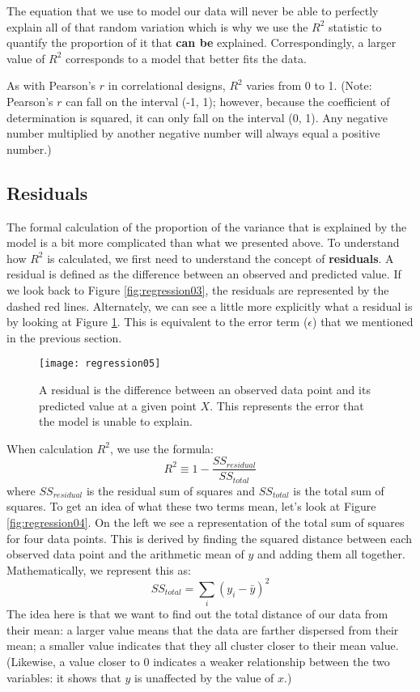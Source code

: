 The equation that we use to model our data will never be able to perfectly explain all of that random variation which is why we use the $R^2$ statistic to quantify the proportion of it that \textbf{can be} explained. Correspondingly, a larger value of $R^2$ corresponds to a model that better fits the data.

As with Pearson's $r$ in correlational designs, $R^2$ varies from 0 to 1. (Note: Pearson's $r$ can fall on the interval (-1, 1); however, because the coefficient of determination is squared, it can only fall on the interval (0, 1). Any negative number multiplied by another negative number will always equal a positive number.)

\subsection{Residuals}

The formal calculation of the proportion of the variance that is explained by the model is a bit more complicated than what we presented above. To understand how $R^2$ is calculated, we first need to understand the concept of \textbf{residuals}. A residual is defined as the difference between an observed and predicted value. If we look back to Figure \ref{fig:regression03}, the residuals are represented by the dashed red lines. Alternately, we can see a little more explicitly what a residual is by looking at Figure \ref{fig:regression05}. This is equivalent to the error term ($\epsilon$) that we mentioned in the previous section.

\begin{figure}[h]
\texttt{[image: regression05]}
\label{fig:regression05}
\caption{A residual is the difference between an observed data point and its predicted value at a given point $X$. This represents the error that the model is unable to explain.}
\end{figure}

When calculation $R^2$, we use the formula:
\begin{equation}
R^2 \equiv 1-\frac{SS_{residual}}{SS_{total}}
\end{equation}
where $SS_{residual}$ is the residual sum of squares and $SS_{total}$ is the total sum of squares. To get an idea of what these two terms mean, let's look at Figure \ref{fig:regression04}. On the left we see a representation of the total sum of squares for four data points. This is derived by finding the squared distance between each observed data point and the arithmetic mean of $y$ and adding them all together. Mathematically, we represent this as:
\begin{equation*}
SS_{total} =\sum_i \left(y_i-\bar{y}\right)^2
\end{equation*}
The idea here is that we want to find out the total distance of our data from their mean: a larger value means that the data are farther dispersed from their mean; a smaller value indicates that they all cluster closer to their mean value. (Likewise, a value closer to 0 indicates a weaker relationship between the two variables: it shows that $y$ is unaffected by the value of $x$.)

